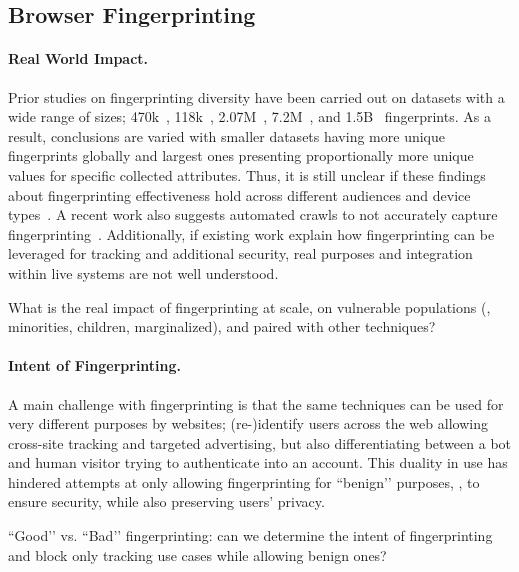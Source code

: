 \subsection{Browser Fingerprinting}
\vspace{-5mm}

\paragraph{Real World Impact.}
Prior studies on fingerprinting diversity have been carried out on datasets with a wide range of sizes; 470k~\cite{eckersleyHowUniqueYour2010}, 118k~\cite{laperdrixBeautyBeastDiverting2016}, 2.07M~\cite{gomez-boixHidingCrowdAnalysis2018}, 7.2M~\cite{liWhoTouchedMy2020}, and 1.5B~\cite{wuHimManyFaces2023} fingerprints. As a result, conclusions are varied with smaller datasets having more unique fingerprints globally and largest ones presenting proportionally more unique values for specific collected attributes. Thus, it is still unclear if these findings about fingerprinting effectiveness hold across different audiences and device types~\cite{berkeHowUniqueWhose2025}. A recent work also suggests automated crawls to not accurately capture fingerprinting~\cite{muthu2025beyond}. Additionally, if existing work explain how fingerprinting can be leveraged for tracking and additional security, real purposes and integration within live systems are not well understood.

\begin{opbox}
What is the real impact of fingerprinting at scale, on vulnerable populations (\eg{}, minorities, children, marginalized), and paired with other techniques?
\end{opbox}
\vspace{-3mm}


\paragraph{Intent of Fingerprinting.}
A main challenge with fingerprinting is that the same techniques can be used for very different purposes by websites; (re-)identify users across the web allowing cross-site tracking and targeted advertising, but also differentiating between a bot and human visitor trying to authenticate into an account. This duality in use has hindered attempts at only allowing fingerprinting for ``benign’’ purposes, \ie{}, to ensure security, while also preserving users' privacy.

\begin{opbox}
``Good’’  vs. ``Bad’’ fingerprinting: can we determine the intent of fingerprinting and block only tracking use cases while allowing benign ones? 
\end{opbox}
\vspace{-3mm}




